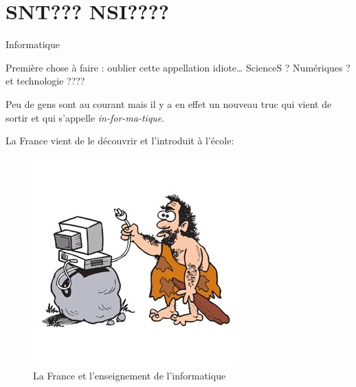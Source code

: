 \documentclass[french,handout]{beamer}
\begin{document}

 

\normalsize





























\section{SNT??? NSI????}

\begin{frame}[fragile]{Informatique}
\protect\hypertarget{informatique}{}


Première chose à faire : oublier cette appellation idiote\ldots{}
\pause ScienceS ? \pause Numériques ? \pause et technologie ????
\pause

Peu de gens sont au courant mais il y a en effet un nouveau truc qui
vient de sortir et qui s'appelle \pause \emph{in-for-ma-tique}.


\end{frame}

\begin{frame}
   La France vient
de le découvrir et l'introduit à l'école:\pause
\begin{figure}
\centering
\includegraphics{./caveman.jpg}
\caption{La France et l'enseignement de l'informatique}
\end{figure}
\end{frame}
\end{document}
